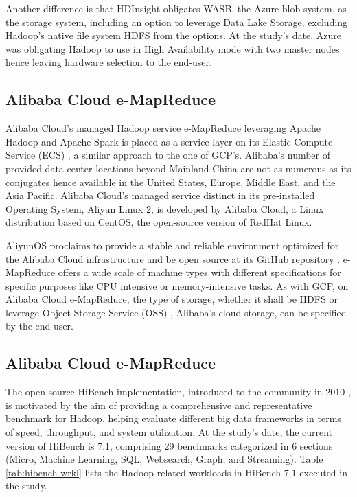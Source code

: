\documentclass[review]{elsarticle}
\begin{document}
	Another difference is that HDInsight obligates WASB, the Azure blob system, as the storage system, including an option to leverage Data Lake Storage, excluding Hadoop's native file system HDFS from the options. At the study's date, Azure was obligating Hadoop to use in High Availability mode with two master nodes hence leaving hardware selection to the end-user.
	
	\subsection{Alibaba Cloud e-MapReduce}\label{Alibaba_eMapReduce}
	Alibaba Cloud's managed Hadoop service e-MapReduce leveraging Apache Hadoop and Apache Spark is placed as a service layer on its Elastic Compute Service (ECS) \cite{noauthor_alielastic_nodate}, a similar approach to the one of GCP's. Alibaba's number of provided data center locations beyond Mainland China are not as numerous as its conjugates hence available in the United States, Europe, Middle East, and the Asia Pacific. Alibaba Cloud's managed service distinct in its pre-installed Operating System, Aliyun Linux 2, is developed by Alibaba Cloud, a Linux distribution based on CentOS, the open-source version of RedHat Linux. 
	
	AliyunOS proclaims to provide a stable and reliable environment optimized for the Alibaba Cloud infrastructure and be open source at its GitHub repository \cite{noauthor_alibaba_nodate}. e-MapReduce offers a wide scale of machine types with different specifications for specific purposes like CPU intensive or memory-intensive tasks. As with GCP, on Alibaba Cloud e-MapReduce, the type of storage, whether it shall be HDFS or leverage Object Storage Service (OSS) \cite{noauthor_oss_nodate}, Alibaba's cloud storage, can be specified by the end-user.
	
	\subsection{Alibaba Cloud e-MapReduce}\label{Alibaba_eMapReduce}
	The open-source HiBench implementation, introduced to the community in 2010 \cite{huang_hibench_2010}, is motivated by the aim of providing a comprehensive and representative benchmark for Hadoop, helping evaluate different big data frameworks in terms of speed, throughput, and system utilization. At the study's date, the current version of HiBench is 7.1, comprising 29 benchmarks categorized in 6 sections (Micro, Machine Learning, SQL, Websearch, Graph, and Streaming). Table \ref{tab:hibench-wrkl} lists the Hadoop related workloads in HiBench 7.1 \cite{noauthor_release_nodate} executed in the study. 
	
\end{document}
